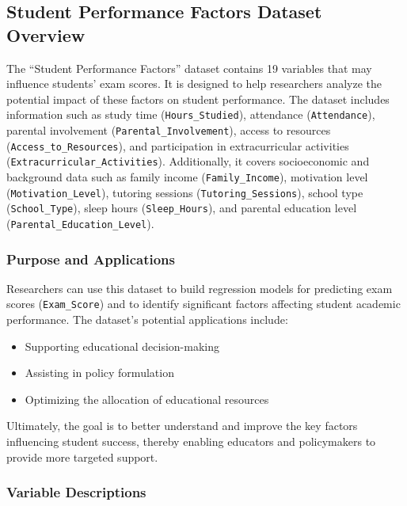\documentclass[11pt]{article}
\providecommand{\tightlist}{%
      \setlength{\itemsep}{0pt}\setlength{\parskip}{0pt}}
\begin{document}
    \subsection{Student Performance Factors Dataset
Overview}\label{student-performance-factors-dataset-overview}

The ``Student Performance Factors'' dataset contains 19 variables that
may influence students' exam scores. It is designed to help researchers
analyze the potential impact of these factors on student performance.
The dataset includes information such as study time
(\texttt{Hours\_Studied}), attendance (\texttt{Attendance}), parental
involvement (\texttt{Parental\_Involvement}), access to resources
(\texttt{Access\_to\_Resources}), and participation in extracurricular
activities (\texttt{Extracurricular\_Activities}). Additionally, it
covers socioeconomic and background data such as family income
(\texttt{Family\_Income}), motivation level
(\texttt{Motivation\_Level}), tutoring sessions
(\texttt{Tutoring\_Sessions}), school type (\texttt{School\_Type}),
sleep hours (\texttt{Sleep\_Hours}), and parental education level
(\texttt{Parental\_Education\_Level}).

\subsubsection{Purpose and Applications}\label{purpose-and-applications}

Researchers can use this dataset to build regression models for
predicting exam scores (\texttt{Exam\_Score}) and to identify
significant factors affecting student academic performance. The
dataset's potential applications include:

\begin{itemize}
\tightlist
\item
  Supporting educational decision-making
\item
  Assisting in policy formulation
\item
  Optimizing the allocation of educational resources
\end{itemize}

Ultimately, the goal is to better understand and improve the key factors
influencing student success, thereby enabling educators and policymakers
to provide more targeted support.

\subsubsection{Variable Descriptions}\label{variable-descriptions}
\end{document}
